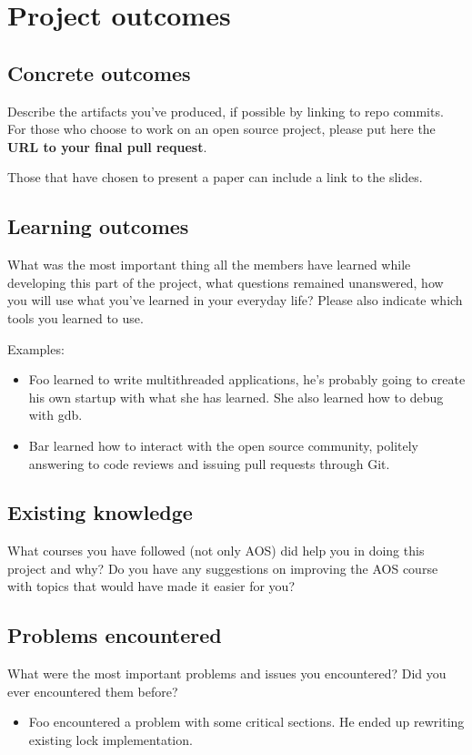 \section{Project outcomes}

\subsection{Concrete outcomes}
Describe the artifacts you've produced, if possible by linking to repo commits.
For those who choose to work on an open source project, please put here the
\textbf{URL to your final pull request}.

Those that have chosen to present a paper can include a link to the slides.

\subsection{Learning outcomes}

What was the most important thing all the members have learned while
developing this part of the project, what questions remained unanswered,
how you will use what you've learned in your everyday life?
Please also indicate which tools you learned to use.

Examples:

\begin{itemize}
  \item Foo learned to write multithreaded applications, he's probably going to
        create his own startup with what she has learned. She also learned how to
        debug with gdb.
  \item Bar learned how to interact with the open source community, politely
        answering to code reviews and issuing pull requests through Git.
\end{itemize}

\subsection{Existing knowledge}
What courses you have followed (not only AOS) did help you in doing this project
and why? Do you have any suggestions on improving the AOS course with topics
that would have made it easier for you?

\subsection{Problems encountered}
What were the most important problems and issues you encountered? Did you ever
encountered them before?

\begin{itemize}
  \item Foo encountered a problem with some critical sections. He ended up
        rewriting existing lock implementation.
\end{itemize}